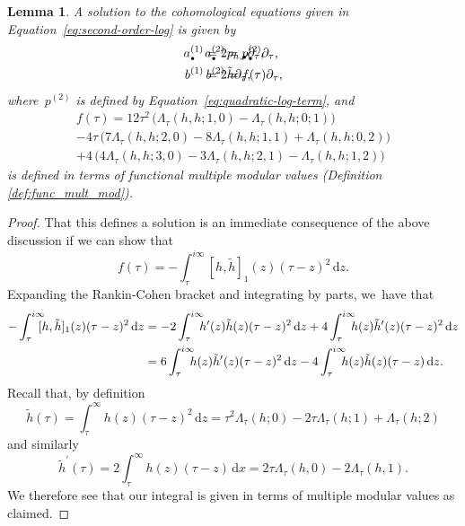 \documentclass[JEP,XML,SOM,Unicode,published]{cedram}
\let\oldbullet\bullet
\renewcommand{\bullet}{{\scriptscriptstyle\oldbullet}}
\theoremstyle{plain}
\newtheorem{lemma}[theoremcounter]{Lemma}
\theoremstyle{definition}
\newcommand{\tx}{\text}
\newcommand{\rmd}{\ensuremath{\mathrm{d}}}
\newcommand{\dz}{\rmd z}
\newcommand{\dx}{\rmd x}
\begin{document}
\begin{lemma}\label{lem:second-order-solutions}
A solution to the cohomological equations given in Equation~\eqref{eq:second-order-log} is given by
\begin{align*}
a^{(1)}_\bullet &= 2p_{h,\bullet}\partial_\tau
\tx{,}&\hspace*{-2cm}
a^{(2)}_\bullet &= p^{(2)}_\bullet \partial_\tau
\tx{,}\\
b^{(1)} &= 2\tilde{h}\partial_\tau
\tx{,}&\hspace*{-2cm}
b^{(2)} &= f(\tau)\partial_\tau
\tx{,}
\end{align*}
where~$p^{(2)}$ is defined by Equation~\eqref{eq:quadratic-log-term}, and
\begin{multline*}
f(\tau)
={}
 12\tau^2 \,\bigl(\Lambda_\tau(h,h;1,0) - \Lambda_\tau(h,h;0;1)\bigr)\\
 -4\tau \,\bigl(7\Lambda_\tau(h,h;2,0) - 8\Lambda_\tau(h,h;1,1) +\Lambda_\tau(h,h;0,2)\bigr)\\
 +4 \,\bigl(4\Lambda_\tau(h,h;3,0) - 3\Lambda_\tau(h,h;2,1) - \Lambda_\tau(h,h;1,2)\bigr)
\end{multline*}
is defined in terms of functional multiple modular values (Definition \ref{def:func_mult_mod}).
\end{lemma}
\begin{proof}
That this defines a solution is an immediate consequence of the above discussion if we can show that
\begin{equation*}f(\tau) = -\int_\tau^{i\infty} [h,\tilde{h}]_1(z)(\tau-z)^2\,\dz\tx{.}\end{equation*}
Expanding the Rankin-Cohen bracket and integrating by parts, we~have that
\begin{align*}
-\int_\tau^{i\infty}\hspace*{-2mm} [h,\tilde{h}]_1(z)(\tau-z)^2\,\dz &= -2\int_{\tau}^{i\infty}\hspace*{-2mm} h^\prime(z)\tilde{h}(z)(\tau-z)^2\,\dz +4\int_{\tau}^{i\infty}\hspace*{-2mm}h(z)\tilde{h}^\prime(z)(\tau-z)^2\,\dz\\
&= 6\int_{\tau}^{i\infty}\hspace*{-2mm} h(z)\tilde{h}^\prime(z)(\tau-z)^2\,\dz -4 \int_{\tau}^{i\infty}\hspace*{-2mm}h(z)\tilde{h}(z)(\tau-z)\,\dz\tx{.}
\end{align*}
Recall that, by definition
\begin{equation*}\tilde{h}(\tau) = \int_{\tau}^\infty h(z)(\tau-z)^2\,\dz = \tau^2\Lambda_\tau(h;0) - 2\tau\Lambda_\tau(h;1) + \Lambda_\tau(h;2)\end{equation*}
and similarly
\begin{equation*}\tilde{h}^\prime(\tau) = 2\int_\tau^\infty h(z)(\tau-z) \,\dx = 2\tau\Lambda_\tau(h,0) -2\Lambda_\tau(h,1)\tx{.}\end{equation*}
We therefore see that our integral is given in terms of multiple modular values as claimed.
\end{proof}
\end{document}
